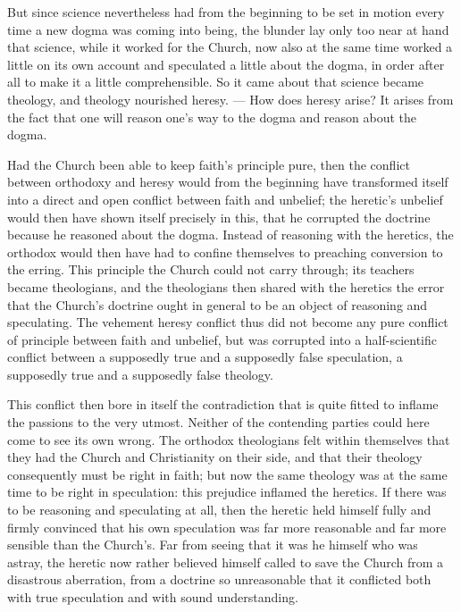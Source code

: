\documentclass[12pt,a4paper]{book}
\begin{document}
But since science nevertheless had from the beginning to be set in motion every time a new dogma
was coming into being, the blunder lay only too near at hand that science, while it worked for
the Church, now also at the same time worked a little on its own account and speculated a little
about the dogma, in order after all to make it a little comprehensible. So it came about that
science became theology, and theology nourished heresy. --- How does heresy arise? It arises
from the fact that one will reason one's way to the dogma and reason about the dogma.

Had the Church been able to keep faith's principle pure, then the conflict between orthodoxy and
heresy would from the beginning have transformed itself into a direct and open conflict between
faith and unbelief; the heretic's unbelief would then have shown itself precisely
in this, that he corrupted the doctrine because he reasoned about the dogma. Instead of reasoning
with the heretics, the orthodox would then have had to confine themselves to preaching conversion
to the erring. This principle the Church could not carry through; its teachers became
theologians, and the theologians then shared with the heretics the error that the Church's
doctrine ought in general to be an object of reasoning and speculating. The vehement heresy
conflict thus did not become any pure conflict of principle between faith and unbelief, but was
corrupted into a half-scientific conflict between a supposedly true and a supposedly false
speculation, a supposedly true and a supposedly false theology.

This conflict then bore in itself the contradiction that is quite fitted to inflame the passions
to the very utmost. Neither of the contending parties could here come to see its own wrong. The
orthodox theologians felt within themselves that they had the Church and Christianity on their
side, and that their theology consequently must be right in faith; but now the same theology was
at the same time to be right in speculation: this prejudice inflamed the heretics. If there was
to be reasoning and speculating at all, then the heretic held himself fully and firmly convinced
that his own speculation was far more reasonable and far more sensible than the Church's. Far
from seeing that it was he himself who was astray, the heretic now rather believed himself called
to save the Church from a disastrous aberration, from a doctrine so unreasonable that it
conflicted both with true speculation and with sound understanding.
\end{document}
